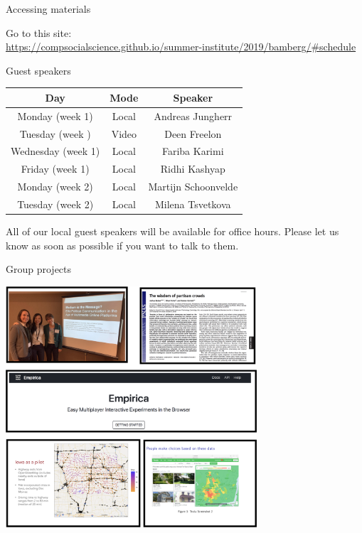 \documentclass{beamer}
\begin{document}
\begin{frame}{Accessing materials}

Go to this site: \\
\url{https://compsocialscience.github.io/summer-institute/2019/bamberg/\#schedule}

\end{frame}


\begin{frame}{Guest speakers}



\begin{center}
\begin{tabular}{ c|c|c } 
\hline
\textbf{Day} & \textbf{Mode} & \textbf{Speaker} \\
\hline
Monday (week 1) & Local & Andreas Jungherr\\ 
Tuesday (week ) & Video & Deen Freelon \\ 
Wednesday (week 1) & Local & Fariba Karimi \\ 
Friday  (week 1)& Local & Ridhi Kashyap\\ 
Monday  (week 2)& Local & Martijn Schoonvelde\\ 
Tuesday (week 2)& Local & Milena Tsvetkova \\ 

\hline
\end{tabular}
\end{center}

All of our local guest speakers will be available for office hours. Please let us know as soon as possible if you want to talk to them.

\end{frame}


\begin{frame}{Group projects}

\begin{center}
\includegraphics[width=0.70\textwidth]{figures/2019_group_projects.png}
\end{center}

\end{frame}
\end{document}
